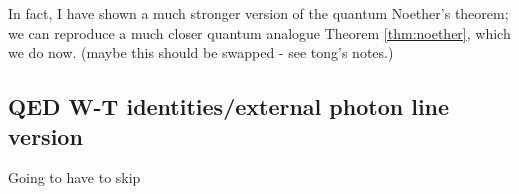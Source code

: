 \documentclass[main.tex]{subfiles}
\begin{document}
In fact, I have shown a much stronger version of the quantum Noether's theorem; we can reproduce a much closer quantum analogue Theorem \ref{thm:noether}, which we do now. (maybe this should be swapped - see tong's notes.)

\subsection{QED W-T identities/external photon line version}

Going to have to skip
\end{document}

